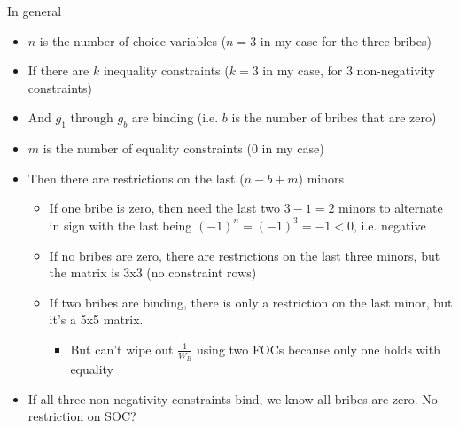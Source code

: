 \documentclass[12pt]{article}
\begin{document}
\vskip1in
In general
\begin{itemize}
	\item $n$ is the number of choice variables ($n=3$ in my case for the three bribes)
	\item If there are $k$ inequality constraints ($k=3$ in my case, for 3 non-negativity constraints)
	\item And $g_1$ through $g_b$ are binding (i.e. $b$ is the number of bribes that are zero)
	\item $m$ is the number of equality constraints (0 in my case)
	\item Then there are restrictions on the last ($n-b+m$) minors
		\begin{itemize}
			\item If one bribe is zero, then need the last two $3-1 =2$ minors to alternate in sign with the last being $(-1)^n = (-1)^3 = -1 <0$, i.e. negative
			\item If no bribes are zero, there are restrictions on the last three minors, but the matrix is 3x3 (no constraint rows)
			\item If two bribes are binding, there is only a restriction on the last minor, but it's a 5x5 matrix.
				\begin{itemize}
					\item But can't wipe out $\frac{1}{W_B}$ using two FOCs because only one holds with equality
				\end{itemize}
		\end{itemize}
	\item If all three non-negativity constraints bind, we know all bribes are zero. No restriction on SOC?
\end{itemize}


\newpage
\end{document}
